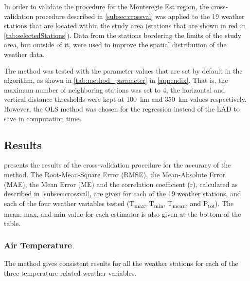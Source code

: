\documentclass[TechnicalNoteMeteo.tex]{subfiles}
\begin{document}
In order to validate the procedure for the Monteregie Est region, the cross-validation procedure described in \cref{subsec:crossval} was applied to the 19 weather stations that are located within the study area (stations that are shown in red in \cref{tab:selectedStations}). Data from the stations bordering the limits of the study area, but outside of it, were used to improve the spatial distribution of the weather data. 

The method was tested with the parameter values that are set by default in the algorithm, as shown in \cref{tab:method_parameter} in \ref{appendix}. That is, the maximum number of neighboring stations was set to 4, the horizontal and vertical distance thresholds were kept at \SI{100}{km} and \SI{350}{km} values respectively. However, the OLS method was chosen for the regression instead of the LAD to save in computation time.

\subsection{Results}

 presents the results of the cross-validation procedure for the accuracy of the method. The Root-Mean-Square Error (RMSE), the Mean-Absolute Error (MAE), the Mean Error (ME) and the correlation coefficient (r), calculated as described in \cref{subsec:crossval}, are given for each of the 19 weather stations, and each of the four weather variables tested (T\textsubscript{max}, T\textsubscript{min}, T\textsubscript{mean}, and P\textsubscript{tot}). The mean, max, and min value for each estimator is also given at the bottom of the table.


\subsubsection{Air Temperature}

The method gives consistent results for all the weather stations for each of the three temperature-related weather variables.


\end{document}
